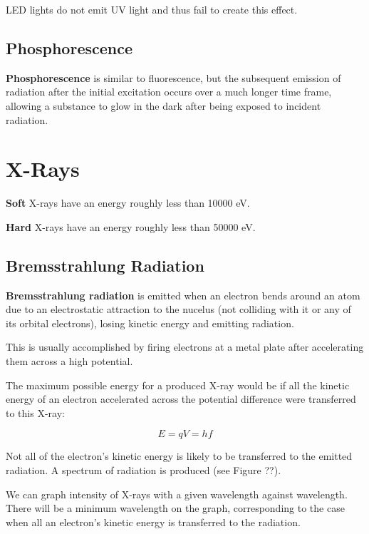 \documentclass[a4paper,11pt]{report}
\begin{document}
LED lights do not emit UV light and thus fail to create this effect.

\subsection{Phosphorescence}

\textbf{Phosphorescence} is similar to fluorescence, but the subsequent emission
of radiation after the initial excitation occurs over a much longer time frame,
allowing a substance to glow in the dark after being exposed to incident
radiation.


\section{X-Rays}

\textbf{Soft} X-rays have an energy roughly less than 10000 eV.

\textbf{Hard} X-rays have an energy roughly less than 50000 eV.

\subsection{Bremsstrahlung Radiation}



\textbf{Bremsstrahlung radiation} is emitted when an electron bends around an
atom due to an electrostatic attraction to the nucelus (not colliding with it
or any of its orbital electrons), losing kinetic energy and emitting radiation.

This is usually accomplished by firing electrons at a metal plate after
accelerating them across a high potential.

The maximum possible energy for a produced X-ray would be if all the kinetic
energy of an electron accelerated across the potential difference were
transferred to this X-ray:

$$
E = qV = hf
$$

Not all of the electron's kinetic energy is likely to be transferred to the
emitted radiation. A spectrum of radiation is produced (see Figure ??).

We can graph intensity of X-rays with a given wavelength against wavelength.
There will be a minimum wavelength on the graph, corresponding to the case when
all an electron's kinetic energy is transferred to the radiation.
\end{document}
